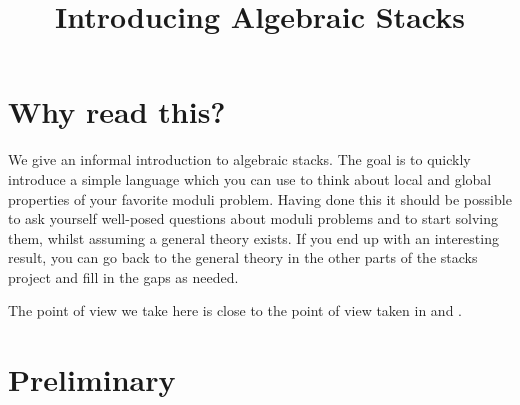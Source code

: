 

%


\title{Introducing Algebraic Stacks}

\maketitle

\label{section-phantom}

\tableofcontents




\section{Why read this?}
\label{section-introduction}

\noindent
We give an informal introduction to algebraic stacks. The goal is to
quickly introduce a simple language which you can use to think
about local and global properties of your favorite moduli problem.
Having done this it should be possible to ask yourself well-posed questions
about moduli problems and to start solving them, whilst assuming a general
theory exists. If you end up with an interesting result,
you can go back to the general theory in the other parts of the stacks
project and fill in the gaps as needed.

\medskip\noindent
The point of view we take here is close to the point of view taken in
\cite{KatzMazur} and \cite{mumford_picard}.






\section{Preliminary}
\label{section-preliminary}

